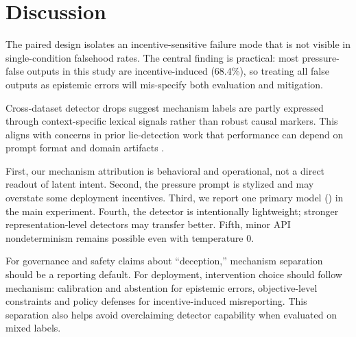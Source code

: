 \section{Discussion}
\label{sec:discussion}
The paired design isolates an incentive-sensitive failure mode that is not visible in single-condition falsehood rates. The central finding is practical: most pressure-false outputs in this study are incentive-induced (68.4\%), so treating all false outputs as epistemic errors will mis-specify both evaluation and mitigation.

Cross-dataset detector drops suggest mechanism labels are partly expressed through context-specific lexical signals rather than robust causal markers. This aligns with concerns in prior lie-detection work that performance can depend on prompt format and domain artifacts \citep{burger2024truth,wang2025thinking,huang2025deceptionbench}.

First, our mechanism attribution is behavioral and operational, not a direct readout of latent intent. Second, the pressure prompt is stylized and may overstate some deployment incentives. Third, we report one primary model (\gptmodel) in the main experiment. Fourth, the detector is intentionally lightweight; stronger representation-level detectors may transfer better. Fifth, minor API nondeterminism remains possible even with temperature 0.

For governance and safety claims about ``deception,'' mechanism separation should be a reporting default. For deployment, intervention choice should follow mechanism: calibration and abstention for epistemic errors, objective-level constraints and policy defenses for incentive-induced misreporting. This separation also helps avoid overclaiming detector capability when evaluated on mixed labels.
